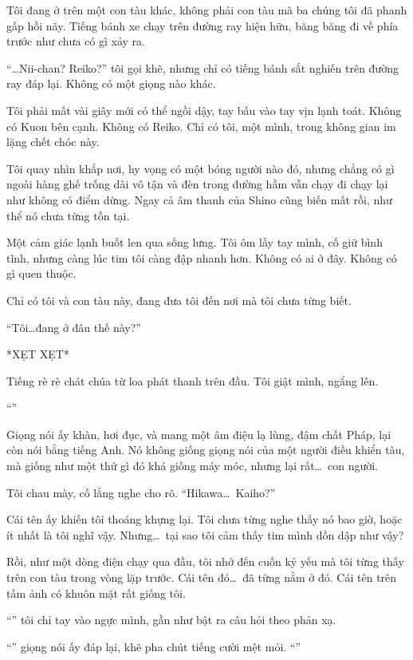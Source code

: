 \documentclass[../main.tex]{subfiles}
\begin{document}
Tôi đang ở trên một con tàu khác, không phải con tàu mà ba chúng tôi đã phanh gấp hồi nãy. Tiếng bánh xe chạy trên đường ray hiện hữu, băng băng đi về phía trước như chưa có gì xảy ra.

``\dots Nii-chan? Reiko?'' tôi gọi khẽ, nhưng chỉ có tiếng bánh sắt nghiến trên đường ray đáp lại. Không có một giọng nào khác.

Tôi phải mất vài giây mới có thể ngồi dậy, tay bấu vào tay vịn lạnh toát. Không có Kuon bên cạnh. Không có Reiko. Chỉ có tôi, một mình, trong không gian im lặng chết chóc này.

Tôi quay nhìn khắp nơi, hy vọng có một bóng người nào đó, nhưng chẳng có gì ngoài hàng ghế trống dài vô tận và đèn trong đường hầm vẫn chạy đi chạy lại như không có điểm dừng. Ngay cả âm thanh của Shino cũng biến mất rồi, như thể nó chưa từng tồn tại.

Một cảm giác lạnh buốt len qua sống lưng. Tôi ôm lấy tay mình, cố giữ bình tĩnh, nhưng càng lúc tim tôi càng đập nhanh hơn. Không có ai ở đây. Không có gì quen thuộc.

Chỉ có tôi và con tàu này, đang đưa tôi đến nơi mà tôi chưa từng biết.

``Tôi\dots đang ở đâu thế này?''

*XẸT XẸT*

Tiếng rè rè chát chúa từ loa phát thanh trên đầu. Tôi giật mình, ngẩng lên.

``''

Giọng nói ấy khàn, hơi đục, và mang một âm điệu lạ lùng, đậm chất Pháp, lại còn nói bằng tiếng Anh. Nó không giống giọng nói của một người điều khiển tàu, mà giống như một thứ gì đó khá giống máy móc, nhưng lại rất\dots\ con người.

Tôi chau mày, cố lắng nghe cho rõ. ``Hikawa\dots\ Kaiho?''

Cái tên ấy khiến tôi thoáng khựng lại. Tôi chưa từng nghe thấy nó bao giờ, hoặc ít nhất là tôi nghĩ vậy. Nhưng\dots\ tại sao tôi cảm thấy tim mình dồn dập như vậy?

Rồi, như một dòng điện chạy qua đầu, tôi nhớ đến cuốn kỷ yếu mà tôi từng thấy trên con tàu trong vòng lặp trước. Cái tên đó\dots\ đã từng nằm ở đó. Cái tên trên tấm ảnh có khuôn mặt rất giống tôi.

``'' tôi chỉ tay vào ngực mình, gần như bật ra câu hỏi theo phản xạ.

``'' giọng nói ấy đáp lại, khẽ pha chút tiếng cười mệt mỏi. ``''
\end{document}
